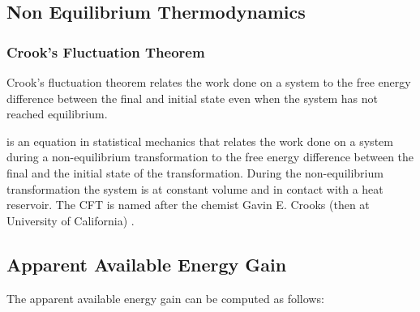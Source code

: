 \documentclass[]{article}
\begin{document}
\subsection{Non Equilibrium Thermodynamics}\label{non-equilibrium-thermodynamics}

\subsubsection{Crook's Fluctuation Theorem}\label{crooks-fluctuation-theorem}

Crook's fluctuation theorem \cite{Crooks-fluctuation99} relates the work
done on a system to the free energy difference between the final and
initial state even when the system has not reached equilibrium.

is an equation in statistical mechanics that relates the work done on a
system during a non-equilibrium transformation to the free energy
difference between the final and the initial state of the
transformation. During the non-equilibrium transformation the system is
at constant volume and in contact with a heat reservoir. The CFT is
named after the chemist Gavin E. Crooks (then at University of
California) \cite{Crooks-fluctuation99}.



\appendix

\subsection{Apparent Available Energy Gain}\label{sec-apparent-available-energy-gain}

The apparent available energy gain can be computed as follows:
\end{document}
